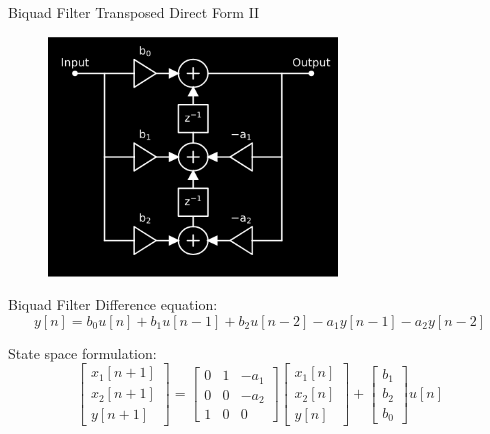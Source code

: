 \ifdefined\DAFX
\else
\begin{frame}
\end{frame}
\fi

\begin{frame}{Biquad Filter}
    Transposed Direct Form II
    \begin{figure}
        \includegraphics[height=2.5in]{../NonlinearBiquad/Pics/TDF-II.png}
    \end{figure}
\end{frame}

\begin{frame}{Biquad Filter}
    Difference equation:
    \begin{equation}
        y[n] = b_0 u[n] + b_1 u[n-1]
        + b_2 u[n-2] - a_1 y[n-1]
        - a_2 y[n-2]
    \end{equation}

    State space formulation:
    \begin{equation}
        \begin{bmatrix} x_1[n+1] \\ x_2[n+1] \\ y[n+1] \end{bmatrix} =
        \begin{bmatrix} 0& 1& -a_1\\ 0& 0& -a_2\\ 1& 0& 0 \end{bmatrix}
        \begin{bmatrix} x_1[n] \\ x_2[n] \\ y[n] \end{bmatrix}
        + \begin{bmatrix} b_1\\ b_2\\ b_0 \end{bmatrix} u[n]
    \end{equation}
\end{frame}

